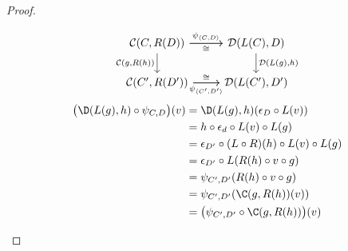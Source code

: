 \begin{theorem}
\begin{proof}
\begin{description}
        \[\begin{tikzcd}[ampersand replacement=\&]
          {\mathcal{C}(C, R(D))} \& {\mathcal{D}(L(C), D)} \\
          {\mathcal{C}(C', R(D'))} \& {\mathcal{D}(L(C'), D')}
          \arrow["{\psi_{\langle C,D\rangle}}", from=1-1, to=1-2]
          \arrow["{\mathcal{D}(L(g),h)}", from=1-2, to=2-2]
          \arrow["{\psi_{\langle C',D'\rangle}}"', from=2-1, to=2-2]
          \arrow["{\mathcal{C}(g,R(h))}"', from=1-1, to=2-1]
          \arrow["\cong", from=2-1, to=2-2]
          \arrow["\cong"', from=1-1, to=1-2]
        \end{tikzcd}\]
        \[
          \begin{aligned}
            \big(\D(L(g), h)\circ \psi_{C, D}\big)(v)
            &= \D(L(g), h) (\epsilon_D \circ L(v))\\
            &= h \circ \epsilon_d \circ L(v) \circ L(g)\\
            &= \epsilon_{D'}\circ (L\circ R)(h) \circ L(v) \circ L(g)\\
            &= \epsilon_{D'}\circ L(R(h) \circ v \circ g)\\
            &= \psi_{C', D'} (R(h) \circ v \circ g)\\
            &= \psi_{C', D'} (\C(g, R(h))(v))\\
            &= \big(\psi_{C', D'} \circ \C(g, R(h))\big)(v)
          \end{aligned}
        \]
    \end{description}
    \vspace{-\baselineskip}
  \end{proof}
\end{theorem}